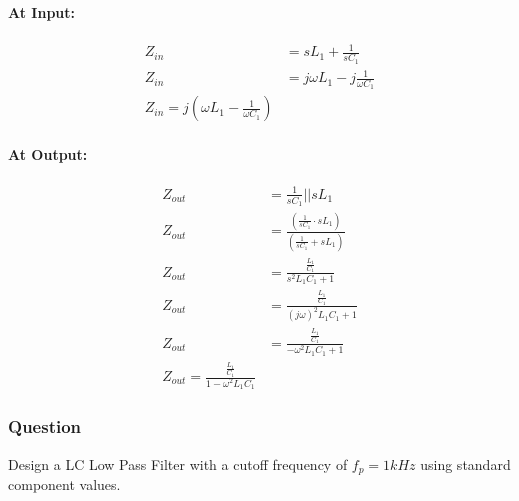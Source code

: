 \begin{enumerate}
    \paragraph{At Input:}
      \begin{align*}
        Z_{in} &= sL_1 + \frac{1}{sC_1} \\
        Z_{in} &= j \omega L_1 - j \frac{1}{\omega C_1} \\
        \boxed{Z_{in} = j \left( \omega L_1 - \frac{1}{\omega C_1} \right)}
      \end{align*}
    \paragraph{At Output:}
      \begin{align*}
        Z_{out} &= \frac{1}{sC_1} || sL_1 \\
        Z_{out} &= \frac{\left( \frac{1}{sC_1} \cdot sL_1 \right)}{\left( \frac{1}{sC_1} + sL_1 \right)} \\
        Z_{out} &= \frac{\frac{L_1}{C_1}}{s^2 L_1 C_1 + 1} \\
        Z_{out} &= \frac{\frac{L_1}{C_1}}{(j \omega)^2 L_1 C_1 + 1} \\
        Z_{out} &= \frac{\frac{L_1}{C_1}}{- \omega^2 L_1 C_1 + 1} \\
        \boxed{Z_{out} = \frac{\frac{L_1}{C_1}}{1 - \omega^2 L_1 C_1}}
      \end{align*}
\end{enumerate}

\subsubsection{Question}
Design a LC Low Pass Filter with a cutoff frequency of
\(f_p = 1 kHz\) using standard component values.
